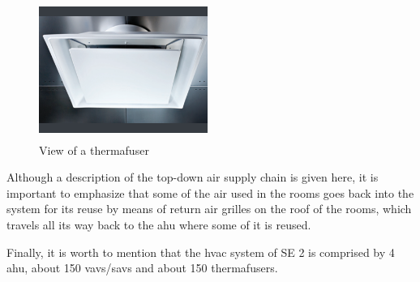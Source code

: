 \begin{figure}[H]
	\centering
  	\includegraphics[width=55mm, height=45mm]{resources/thermafuser.png}
  	\caption{View of a thermafuser}
 	\label{fig:thermafuser}
\end{figure}

Although a description of the top-down air supply chain is given here, it is important to emphasize that some of the air used in the rooms goes back into the system for its reuse by means of return air grilles on the roof of the rooms, which travels all its way back to the \gls{ahu} where some of it is reused.

Finally, it is worth to mention that the \gls{hvac} system of SE 2 is comprised by 4 \gls{ahu}, about 150 \glspl{vav}/\glspl{sav} and  about 150 thermafusers.